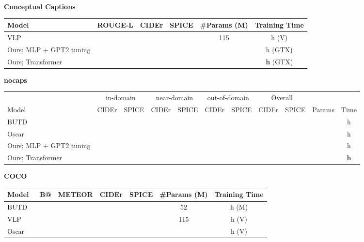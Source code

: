 




\begin{table*}
\begin{center}

 \textbf{Conceptual Captions}
\begin{tabular}{lccccc}
\toprule
Model &  ROUGE-L  & CIDEr  & SPICE  & \#Params (M)  & Training Time   \\ 
\bottomrule
\midrule
VLP &  &  &  & 115 & h (V)\\
\toprule
Ours; MLP + GPT2 tuning &  &  &  &  & h (GTX)\\
\midrule
Ours; Transformer &  &  &  &  & \textbf{h} (GTX) \\
\bottomrule 
\end{tabular}
\vspace{0.15cm}

 \textbf{nocaps}


\begin{tabular}{p{}|cc|cc|cc|cc|cc}
\toprule

& \multicolumn{2}{c}{in-domain} & \multicolumn{2}{c}{near-domain} & \multicolumn{2}{c}{out-of-domain} & \multicolumn{2}{c}{Overall} & & \\
Model &  CIDEr   & SPICE   & CIDEr & SPICE & CIDEr & SPICE & CIDEr & SPICE & Params & Time  \\ 
\bottomrule
\midrule
BUTD ~\cite{anderson2018bottom}  &  &  &  &  &  &  &  &  &  & h  \\
\midrule
Oscar ~\cite{li2020oscar} &  &  &  &  &  &  &  &  &  & h\\
\toprule
Ours; MLP + GPT2 tuning &  &  &  &  &  &  &  & &  & h\\
\midrule
Ours; Transformer &  &  &  &  &  &  &  &  & & \textbf{h} \\
\midrule
\end{tabular}

\vspace{0.15cm}
 \textbf{COCO}


\begin{tabular}{p{}cccccc}
\toprule
Model &   B@  & METEOR  & CIDEr  & SPICE  & \#Params (M)  & Training Time  \\ 
\bottomrule
\midrule
BUTD ~\cite{anderson2018bottom} &   &  &  &  & 52 & h (M)\\
\midrule
VLP ~\cite{zhou2020unified} &   &  &  &  & 115 & h (V)\\
\midrule
Oscar ~\cite{li2020oscar} &  &  &   &  &   & h (V)\\


\end{tabular}
\end{center}
\end{table*}
